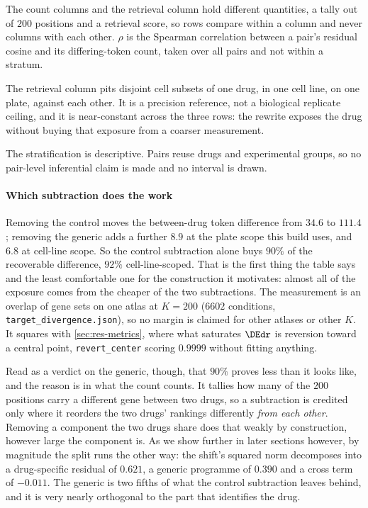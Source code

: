 \begin{table}[htbp]
\begin{fullwidth}
\begin{threeparttable}
  \begin{tablenotes}[flushleft]\footnotesize
  \item The count columns and the retrieval column hold different quantities, a
  tally out of $200$ positions and a retrieval score, so rows compare within a
  column and never columns with each other. $\rho$ is the Spearman correlation
  between a pair's residual cosine and its differing-token count, taken over all
  pairs and not within a stratum.
  \item The retrieval column pits disjoint cell subsets of one drug, in one cell
  line, on one plate, against each other. It is a precision reference, not a
  biological replicate ceiling, and it is near-constant across the three rows: the
  rewrite exposes the drug without buying that exposure from a coarser measurement.
  \item The stratification is descriptive. Pairs reuse drugs and experimental
  groups, so no pair-level inferential claim is made and no interval is drawn.
  \end{tablenotes}
  \end{threeparttable}
  \end{fullwidth}
  \end{table}
  \paragraph{Which subtraction does the work} Removing the control moves the
  between-drug token difference from $34.6$ to $111.4$; removing the generic adds a
  further $8.9$ at the plate scope this build uses, and $6.8$ at cell-line scope. So
  the control subtraction alone buys $90\%$ of the recoverable difference, $92\%$
  cell-line-scoped. That is the first thing the table says and the least comfortable
  one for the construction it motivates: almost all of the exposure comes from the
  cheaper of the two subtractions. The measurement is an overlap of gene sets on one
  atlas at $K = 200$ ($\num{6602}$ conditions, \texttt{target\_divergence.json}), so
  no margin is claimed for other atlases or other $K$. It squares with
  \cref{sec:res-metrics}, where what saturates $\DEdr$ is reversion toward a central
  point, \texttt{revert\_center} scoring $0.9999$ without fitting anything.
  
  Read as a verdict on the generic, though, that $90\%$ proves less than it looks
  like, and the reason is in what the count counts. It tallies how many of the $200$
  positions carry a different gene between two drugs, so a subtraction is credited
  only where it reorders the two drugs' rankings differently \emph{from each other}.
  Removing a component the two drugs share does that weakly by construction, however
  large the component is. As we show further in later sections however, by magnitude the split runs the other way: the shift's
  squared norm decomposes into a drug-specific residual of $0.621$, a generic
  programme of $0.390$ and a cross term of $-0.011$. The generic is two fifths of
  what the control subtraction leaves behind, and it is very nearly orthogonal to
  the part that identifies the drug.
  
